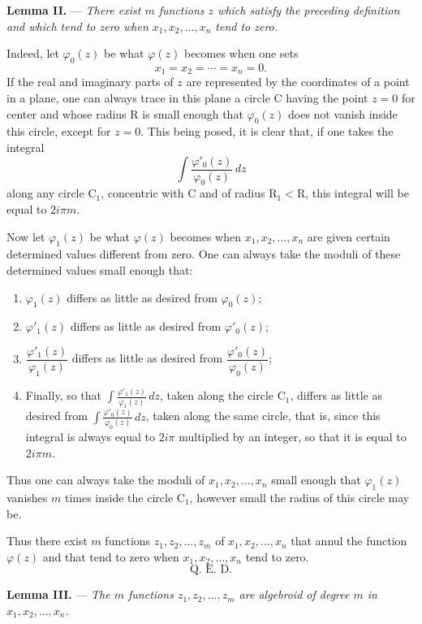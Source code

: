 \documentclass[11pt]{article}
\begin{document}
\medskip
\noindent\textbf{Lemma II.} — \emph{There exist $m$ functions $z$ which satisfy the preceding definition and which tend to zero when $x_1,x_2,\ldots,x_n$ tend to zero.}

Indeed, let $\varphi_0(z)$ be what $\varphi(z)$ becomes when one sets
\[
x_1=x_2=\cdots=x_n=0.
\]
If the real and imaginary parts of $z$ are represented by the coordinates of a point in a plane, one can always trace in this plane a circle C having the point $z=0$ for center and whose radius R is small enough that $\varphi_0(z)$ does not vanish inside this circle, except for $z=0$. This being posed, it is clear that, if one takes the integral
\[
\int \frac{\varphi'_0(z)}{\varphi_0(z)}\,dz
\]
along any circle $\mathrm C_1$, concentric with C and of radius $\mathrm R_1<\mathrm R$, this integral will be equal to $2i\pi m$.

Now let $\varphi_1(z)$ be what $\varphi(z)$ becomes when $x_1,x_2,\ldots,x_n$ are given certain determined values different from zero. One can always take the moduli of these determined values small enough that:
\begin{enumerate}[label=\arabic*\textsuperscript{o}, leftmargin=3em, itemsep=0pt]
\item $\varphi_1(z)$ differs as little as desired from $\varphi_0(z)$;
\item $\varphi'_1(z)$ differs as little as desired from $\varphi'_0(z)$;
\item $\dfrac{\varphi'_1(z)}{\varphi_1(z)}$ differs as little as desired from $\dfrac{\varphi'_0(z)}{\varphi_0(z)}$;
\item Finally, so that $\displaystyle\int \frac{\varphi'_1(z)}{\varphi_1(z)}\,dz$, taken along the circle $\mathrm C_1$, differs as little as desired from $\displaystyle\int \frac{\varphi'_0(z)}{\varphi_0(z)}\,dz$, taken along the same circle, that is, since this integral is always equal to $2i\pi$ multiplied by an integer, so that it is equal to $2i\pi m$.
\end{enumerate}
Thus one can always take the moduli of $x_1,x_2,\ldots,x_n$ small enough that $\varphi_1(z)$ vanishes $m$ times inside the circle $\mathrm C_1$, however small the radius of this circle may be.

Thus there exist $m$ functions $z_1,z_2,\ldots,z_m$ of $x_1,x_2,\ldots,x_n$ that annul the function $\varphi(z)$ and that tend to zero when $x_1,x_2,\ldots,x_n$ tend to zero.
\[
\text{Q. E. D.}
\]

\medskip
\noindent\textbf{Lemma III.} — \emph{The $m$ functions $z_1,z_2,\ldots,z_m$ are algebroid of degree $m$ in $x_1,x_2,\ldots,x_n$.}
\end{document}
